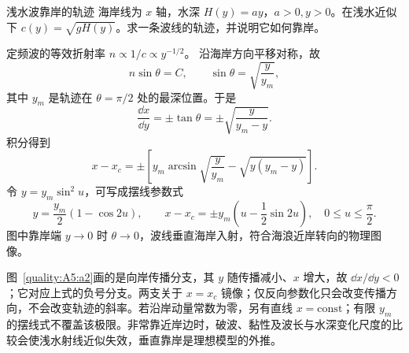 \begin{advexamplebox}{浅水波靠岸的轨迹}\label{advA5:ex:beach-ray}
海岸线为 $x$ 轴，水深 $H(y)=ay$，$a>0,y>0$。在浅水近似下
$c(y)=\sqrt{gH(y)}$。求一条波线的轨迹，并说明它如何靠岸。

\end{advexamplebox}
\begin{advsolution}
定频波的等效折射率 $n\propto1/c\propto y^{-1/2}$。
沿海岸方向平移对称，故
\[
 n\sin\theta=C,\qquad
 \sin\theta=\sqrt{\frac{y}{y_m}},
\]
其中 $y_m$ 是轨迹在 $\theta=\pi/2$ 处的最深位置。于是
\[
 \frac{\dd x}{\dd y}=\pm\tan\theta
 =\pm\sqrt{\frac{y}{y_m-y}}.
\]
积分得到
\[
 \boxed{x-x_c
 =\pm\left[y_m\arcsin\sqrt{\frac{y}{y_m}}
 -\sqrt{y(y_m-y)}\right]}.
\]
令 $y=y_m\sin^2u$，可写成摆线参数式
\[
 y=\frac{y_m}{2}(1-\cos2u),\qquad
 x-x_c=\pm y_m\!\left(u-\frac12\sin2u\right),\quad 0\le u\le\frac\pi2.
\]
图中靠岸端 $y\to0$ 时 $\theta\to0$，波线垂直海岸入射，符合海浪近岸转向的物理图像。


图~\ref{quality:A5:a2}画的是向岸传播分支，其 $y$ 随传播减小、$x$ 增大，故 $\dd x/\dd y<0$；它对应上式的负号分支。两支关于 $x=x_c$ 镜像；仅反向参数化只会改变传播方向，不会改变轨迹的斜率。若沿岸动量常数为零，另有直线 $x=\mathrm{const}$；有限 $y_m$ 的摆线式不覆盖该极限。非常靠近岸边时，破波、黏性及波长与水深变化尺度的比较会使浅水射线近似失效，垂直靠岸是理想模型的外推。
\end{advsolution}

